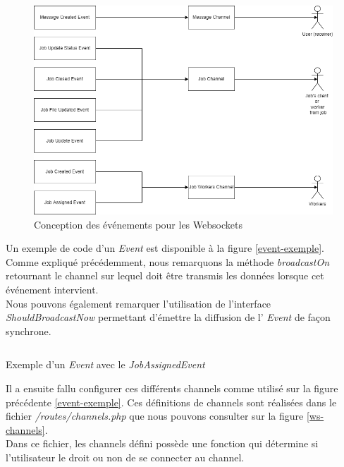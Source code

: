 \documentclass[
    iai, %
    il, %
]{heig-tb}
\begin{document}
\begin{center}
    \begin{figure}[H]
        \includegraphics[width=\textwidth]{./assets/figures/ws-conception-notifications.drawio.png}
        \caption{Conception des événements pour les Websockets \label{ws-conception-notifications.drawio}}
    \end{figure}
\end{center}

Un exemple de code d'un \emph{Event} est disponible à la figure \ref{event-exemple}. \\
Comme expliqué précédemment, nous remarquons la méthode \emph{broadcastOn} retournant le channel sur lequel doit être transmis les données lorsque cet événement intervient. \\
Nous pouvons également remarquer l'utilisation de l'interface \emph{ShouldBroadcastNow} permettant d'émettre la diffusion de l' \emph{Event} de façon synchrone.

\begin{listing}[H]
    \inputminted{php}{assets/code/JobAssignedEvent.php}
    \caption{Exemple d'un \emph{Event} avec le \emph{JobAssignedEvent} \label{event-exemple}}
\end{listing}

Il a ensuite fallu configurer ces différents channels comme utilisé sur la figure précédente \ref{event-exemple}. Ces définitions de channels sont réalisées dans le fichier \emph{/routes/channels.php} que nous pouvons consulter sur la figure \ref{ws-channels}. \\
Dans ce fichier, les channels défini possède une fonction qui détermine si l'utilisateur le droit ou non de se connecter au channel.
\end{document}
